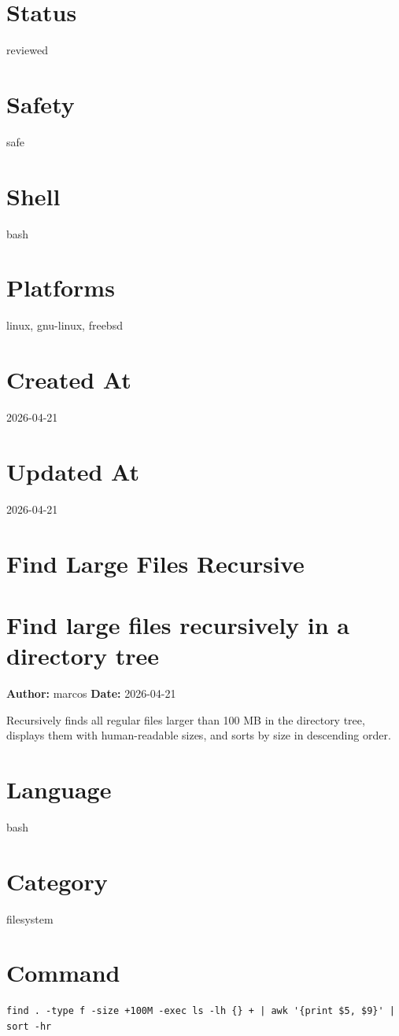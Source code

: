 \documentclass[openany]{book}
\begin{document}
\section*{Status}
reviewed

\section*{Safety}
safe

\section*{Shell}
bash

\section*{Platforms}
linux, gnu-linux, freebsd

\section*{Created At}
2026-04-21

\section*{Updated At}
2026-04-21

\section{Find Large Files Recursive}
\section*{Find large files recursively in a directory tree}
\textbf{Author:} marcos \hfill \textbf{Date:} 2026-04-21

\noindent Recursively finds all regular files larger than 100 MB in the directory tree, displays them with human-readable sizes, and sorts by size in descending order.

\section*{Language}
bash

\section*{Category}
filesystem

\section*{Command}
\begin{lstlisting}
find . -type f -size +100M -exec ls -lh {} + | awk '{print $5, $9}' | sort -hr
\end{lstlisting}
\end{document}
